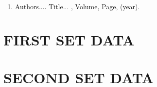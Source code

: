 \documentclass[a4paper, 12pt, oneside]{sastra}
\begin{document}
\pagebreak
\clearpage













%
%
\begin{singlespace}
	
\end{singlespace}

\listofpapers %

\begin{enumerate}  
	\item Authors....  \newblock
	Title...
	, Volume,
	Page, (year).
\end{enumerate}  



\appendix
%
\chapter{FIRST SET DATA}
%
%
%
%
\chapter{SECOND SET DATA}
%
%
%
%
%




\plagarism
\end{document}
